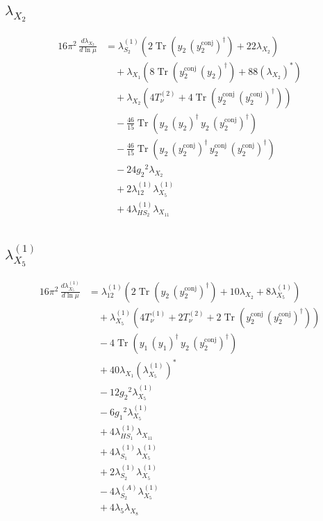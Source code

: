 \documentclass[10pt,a4paper]{article}
\begin{document}
\subsection*{$\lambda_{X_{2}}$}
\begin{align*}
16\pi^2\,\frac{d \lambda_{X_{2}}}{d\ln\mu} &={\lambda_{S_2}^{(1)}} (2 \operatorname{Tr}\!\left({y_2}\,\left({y_{2}^{\mathrm{conj}}}\right)^{\dagger}\right)+22 {\lambda_{X_{2}}}) \\
&\quad +{\lambda_{X_{1}}} (8 \operatorname{Tr}\!\left({y_{2}^{\mathrm{conj}}}\,\left({y_2}\right)^{\dagger}\right)+88 \left({\lambda_{X_{2}}}\right)^{*}) \\
&\quad +{\lambda_{X_{2}}} (4 T_{\nu}^{(2)}+4 \operatorname{Tr}\!\left({y_{2}^{\mathrm{conj}}}\,\left({y_{2}^{\mathrm{conj}}}\right)^{\dagger}\right)) \\
&\quad -\frac{46}{15} \operatorname{Tr}\!\left({y_2}\,\left({y_2}\right)^{\dagger}\,{y_2}\,\left({y_{2}^{\mathrm{conj}}}\right)^{\dagger}\right) \\
&\quad -\frac{46}{15} \operatorname{Tr}\!\left({y_2}\,\left({y_{2}^{\mathrm{conj}}}\right)^{\dagger}\,{y_{2}^{\mathrm{conj}}}\,\left({y_{2}^{\mathrm{conj}}}\right)^{\dagger}\right) \\
&\quad -24 {g_2}^2 {\lambda_{X_{2}}} \\
&\quad +2 {\lambda_{12}^{(1)}} {\lambda_{X_{5}}^{(1)}} \\
&\quad +4 {\lambda_{HS_2}^{(1)}} {\lambda_{X_{11}}} \\
\end{align*}
\subsection*{$\lambda_{X_{5}}^{(1)}$}
\begin{align*}
16\pi^2\,\frac{d \lambda_{X_{5}}^{(1)}}{d\ln\mu} &={\lambda_{12}^{(1)}} (2 \operatorname{Tr}\!\left({y_2}\,\left({y_{2}^{\mathrm{conj}}}\right)^{\dagger}\right)+10 {\lambda_{X_{2}}}+8 {\lambda_{X_{5}}^{(1)}}) \\
&\quad +{\lambda_{X_{5}}^{(1)}} (4 T_{\nu}^{(1)}+2 T_{\nu}^{(2)}+2 \operatorname{Tr}\!\left({y_{2}^{\mathrm{conj}}}\,\left({y_{2}^{\mathrm{conj}}}\right)^{\dagger}\right)) \\
&\quad -4 \operatorname{Tr}\!\left({y_1}\,\left({y_1}\right)^{\dagger}\,{y_2}\,\left({y_{2}^{\mathrm{conj}}}\right)^{\dagger}\right) \\
&\quad +40 {\lambda_{X_{1}}} \left({\lambda_{X_{5}}^{(1)}}\right)^{*} \\
&\quad -12 {g_2}^2 {\lambda_{X_{5}}^{(1)}} \\
&\quad -6 {g_1}^2 {\lambda_{X_{5}}^{(1)}} \\
&\quad +4 {\lambda_{HS_1}^{(1)}} {\lambda_{X_{11}}} \\
&\quad +4 {\lambda_{S_1}^{(1)}} {\lambda_{X_{5}}^{(1)}} \\
&\quad +2 {\lambda_{S_2}^{(1)}} {\lambda_{X_{5}}^{(1)}} \\
&\quad -4 {\lambda_{S_2}^{(A)}} {\lambda_{X_{5}}^{(1)}} \\
&\quad +4 {\lambda_5} {\lambda_{X_{8}}} \\
\end{align*}
\end{document}
